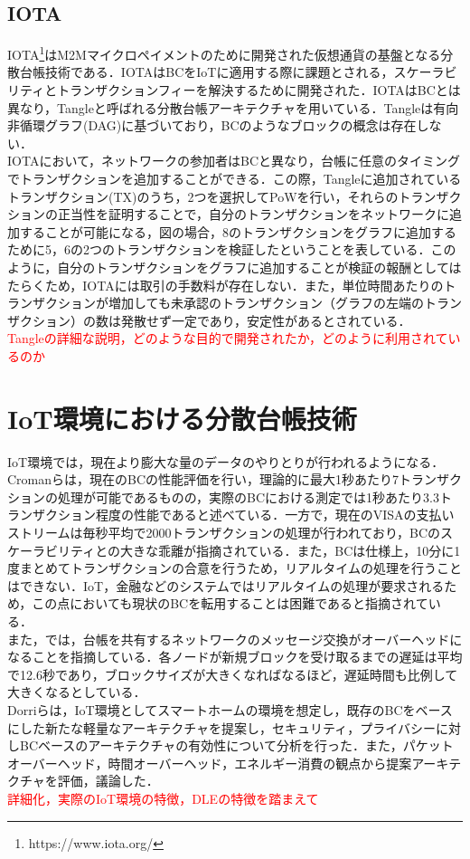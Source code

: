 \documentclass[japanese, macos]{KU2}
\begin{document}
\subsection{IOTA}
IOTA\footnote{https://www.iota.org/}はM2Mマイクロペイメントのために開発された仮想通貨の基盤となる分散台帳技術である．IOTAはBCをIoTに適用する際に課題とされる，スケーラビリティとトランザクションフィーを解決するために開発された．IOTAはBCとは異なり，Tangleと呼ばれる分散台帳アーキテクチャを用いている．Tangleは有向非循環グラフ(DAG)に基づいており，BCのようなブロックの概念は存在しない．\\
IOTAにおいて，ネットワークの参加者はBCと異なり，台帳に任意のタイミングでトランザクションを追加することができる．この際，Tangleに追加されているトランザクション(TX)のうち，2つを選択してPoWを行い，それらのトランザクションの正当性を証明することで，自分のトランザクションをネットワークに追加することが可能になる，図の場合，8のトランザクションをグラフに追加するために5，6の2つのトランザクションを検証したということを表している．このように，自分のトランザクションをグラフに追加することが検証の報酬としてはたらくため，IOTAには取引の手数料が存在しない．また，単位時間あたりのトランザクションが増加しても未承認のトランザクション（グラフの左端のトランザクション）の数は発散せず一定であり，安定性があるとされている\cite{kusmierz2017first}．\\
\textcolor{red}{Tangleの詳細な説明，どのような目的で開発されたか，どのように利用されているのか}\\

\section{IoT環境における分散台帳技術}
IoT環境では，現在より膨大な量のデータのやりとりが行われるようになる．Cromanらは，現在のBCの性能評価を行い，理論的に最大1秒あたり7トランザクションの処理が可能であるものの，実際のBCにおける測定では1秒あたり3.3トランザクション程度の性能であると述べている\cite{croman2016scaling}．一方で，現在のVISAの支払いストリームは毎秒平均で2000トランザクションの処理が行われており，BCのスケーラビリティとの大きな乖離が指摘されている．また，BCは仕様上，10分に1度まとめてトランザクションの合意を行うため，リアルタイムの処理を行うことはできない．IoT，金融などのシステムではリアルタイムの処理が要求されるため，この点においても現状のBCを転用することは困難であると指摘されている．\\
また，\cite{decker2013information}では，台帳を共有するネットワークのメッセージ交換がオーバーヘッドになることを指摘している．各ノードが新規ブロックを受け取るまでの遅延は平均で12.6秒であり，ブロックサイズが大きくなればなるほど，遅延時間も比例して大きくなるとしている．\\
Dorriらは，IoT環境としてスマートホームの環境を想定し，既存のBCをベースにした新たな軽量なアーキテクチャを提案し，セキュリティ，プライバシーに対しBCベースのアーキテクチャの有効性について分析を行った\cite{dorri2017blockchain}．また，パケットオーバーヘッド，時間オーバーヘッド，エネルギー消費の観点から提案アーキテクチャを評価，議論した．\\
\textcolor{red}{詳細化，実際のIoT環境の特徴，DLEの特徴を踏まえて}\\
\end{document}

